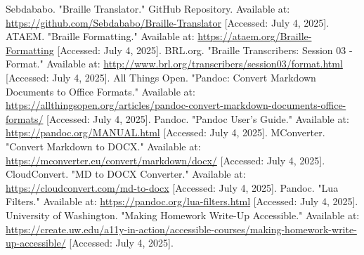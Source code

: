 \begin{thebibliography}{99}
 Sebdababo. "Braille Translator." GitHub Repository. Available at: \url{https://github.com/Sebdababo/Braille-Translator} [Accessed: July 4, 2025].
 ATAEM. "Braille Formatting." Available at: \url{https://ataem.org/Braille-Formatting} [Accessed: July 4, 2025].
 BRL.org. "Braille Transcribers: Session 03 - Format." Available at: \url{http://www.brl.org/transcribers/session03/format.html} [Accessed: July 4, 2025].
 All Things Open. "Pandoc: Convert Markdown Documents to Office Formats." Available at: \url{https://allthingsopen.org/articles/pandoc-convert-markdown-documents-office-formats/} [Accessed: July 4, 2025].
 Pandoc. "Pandoc User’s Guide." Available at: \url{https://pandoc.org/MANUAL.html} [Accessed: July 4, 2025].
 MConverter. "Convert Markdown to DOCX." Available at: \url{https://mconverter.eu/convert/markdown/docx/} [Accessed: July 4, 2025].
 CloudConvert. "MD to DOCX Converter." Available at: \url{https://cloudconvert.com/md-to-docx} [Accessed: July 4, 2025].
 Pandoc. "Lua Filters." Available at: \url{https://pandoc.org/lua-filters.html} [Accessed: July 4, 2025].
 University of Washington. "Making Homework Write-Up Accessible." Available at: \url{https://create.uw.edu/a11y-in-action/accessible-courses/making-homework-write-up-accessible/} [Accessed: July 4, 2025].
\end{thebibliography}
